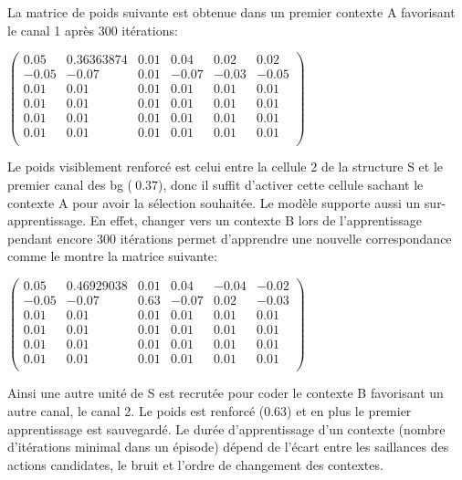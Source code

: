 La matrice de poids suivante est obtenue dans un premier contexte A favorisant le canal 1 après 300 itérations:
\begin{center}
$\begin{pmatrix}
 0.05   &    0.36363874  &    0.01    &    0.04    &    0.02    &     0.02      \\
-0.05   &   -0.07        &    0.01    &   -0.07    &   -0.03    &    -0.05      \\
 0.01   &    0.01        &    0.01    &    0.01    &    0.01    &     0.01     \\
 0.01   &    0.01        &    0.01    &    0.01    &    0.01    &     0.01 \\
 0.01   &    0.01        &    0.01    &    0.01    &    0.01    &     0.01 \\
 0.01   &    0.01        &    0.01    &    0.01    &    0.01    &     0.01 \\
\end{pmatrix}$
\end{center} 
Le poids visiblement renforcé est celui entre la cellule 2 de la structure S et le premier canal des \gls{bg} ($~0.37$), donc il suffit d'activer cette cellule sachant le contexte A pour avoir la sélection souhaitée. Le modèle supporte aussi un sur-apprentissage. En effet, changer vers un contexte B lors de l'apprentissage pendant encore 300 itérations permet d'apprendre une nouvelle correspondance comme le montre la matrice suivante:

\begin{center} 
$\begin{pmatrix}
 0.05   &    0.46929038  &    0.01    &    0.04    &   -0.04    &    -0.02   \\   
-0.05   &   -0.07        &    0.63    &   -0.07    &    0.02    &    -0.03     \\ 
 0.01   &    0.01        &    0.01    &    0.01    &    0.01    &     0.01     \\
 0.01   &    0.01        &    0.01    &    0.01    &    0.01    &     0.01 \\
 0.01   &    0.01        &    0.01    &    0.01    &    0.01    &     0.01 \\
 0.01   &    0.01        &    0.01    &    0.01    &    0.01    &     0.01 \\
\end{pmatrix}$
\end{center} 

Ainsi une autre unité de S est recrutée pour coder le contexte B favorisant un autre canal, le canal 2. Le poids est renforcé (0.63) et en plus le premier apprentissage est sauvegardé. Le durée d'apprentissage d'un contexte (nombre d'itérations minimal dans un épisode) dépend de l'écart entre les saillances des actions candidates, le bruit et l'ordre de changement des contextes.\\

